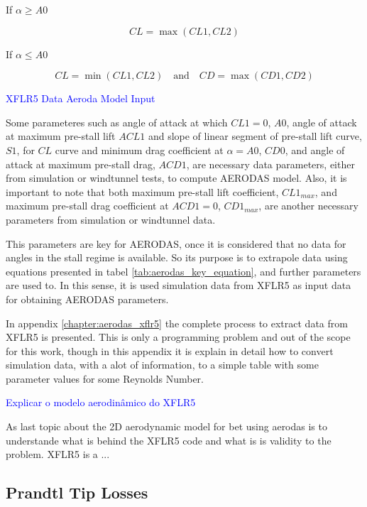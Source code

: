 If $\alpha \geq A0$

\begin{equation}
    C L=\operatorname*{max}(CL1, CL2)
\end{equation}

If $\alpha \leq A0$

\begin{equation}
    CL = \operatorname*{min}(CL1 , CL2) \quad \text{and} \quad CD = \operatorname*{max}(CD1, CD2)
\end{equation}


\textcolor{blue}{XFLR5 Data  Aeroda Model  Input}

Some parameteres such as  angle of attack at which $CL1 = 0$, $A0$, angle of attack at maximum pre-stall lift $ACL1$ and slope of linear segment of pre-stall lift curve, $S1$, for $CL$ curve and minimum drag coefficient at $\alpha = A0$, $CD0$, and angle of attack at maximum pre-stall drag, $ACD1$, are necessary data parameters, either from simulation or windtunnel tests, to compute AERODAS model. Also, it is important to note that both maximum pre-stall lift coefficient, $CL1_{max}$, and maximum pre-stall drag coefficient at $ACD1 = 0$,  $CD1_{max}$, are another necessary parameters from simulation or windtunnel data.

This parameters are key for AERODAS, once it is considered that no data for angles in the stall regime is available. So its purpose is to extrapole data using  equations presented in tabel \ref{tab:aerodas_key_equation}, and further parameters are used to. In this sense, it is used simulation data from XFLR5 as input data for obtaining AERODAS parameters.

In appendix \ref{chapter:aerodas_xflr5} the complete process to extract data from XFLR5 is presented. This is only a programming problem and out of the scope for this work, though in this appendix it is explain in detail how to convert simulation data, with a alot of information, to a simple table with some parameter values for some Reynolds Number.

\textcolor{blue}{Explicar o modelo aerodinâmico do XFLR5}

As last topic about the 2D aerodynamic model for \gls{bet} using aerodas is to understande what is behind the XFLR5 code and what is is validity to the problem. XFLR5 is a ...

\subsection{Prandtl Tip Losses}
\label{section:prandtl_tip}



